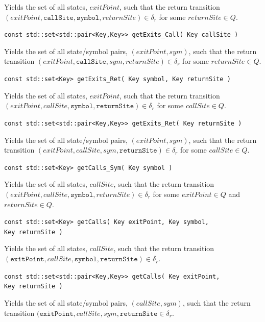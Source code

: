 \documentclass{llncs}
\begin{document}
\begin{description}
    Yields the set of all states, $exitPoint$, such that the return transition $(exitPoint,\texttt{callSite},\texttt{symbol},returnSite) \in \delta_r$ for some $returnSite \in Q$.

  \item\texttt{const std::set<std::pair<Key,Key>> getExits\_Call( Key callSite )}

    Yields the set of all state/symbol pairs, $(exitPoint,sym)$, such that the return transition $(exitPoint,\texttt{callSite},sym,returnSite) \in \delta_r$ for some $returnSite \in Q$.

  \item\texttt{const std::set<Key> getExits\_Ret( Key symbol, Key returnSite )}

    Yields the set of all states, $exitPoint$, such that the return transition $(exitPoint,callSite,\texttt{symbol},\texttt{returnSite}) \in \delta_r$ for some $callSite \in Q$.

  \item\texttt{const std::set<std::pair<Key,Key>> getExits\_Ret( Key returnSite )}

    Yields the set of all state/symbol pairs, $(exitPoint,sym)$, such that the return transition $(exitPoint,callSite,sym,\texttt{returnSite}) \in \delta_r$ for some $callSite \in Q$.

  \item\texttt{const std::set<Key> getCalls\_Sym( Key symbol )}

    Yields the set of all states, $callSite$, such that the return transition $(exitPoint,callSite,\texttt{symbol},returnSite) \in \delta_r$ for some $exitPoint \in Q$ and $returnSite \in Q$.

  \item\texttt{const std::set<Key> getCalls( Key exitPoint, Key symbol,\\ \hspace*{3.25cm} Key returnSite )}

    Yields the set of all states, $callSite$, such that the return transition $(\texttt{exitPoint},callSite,\texttt{symbol},\texttt{returnSite}) \in \delta_r$.

  \item\texttt{const std::set<std::pair<Key,Key>> getCalls( Key exitPoint,\\ \hspace*{3.25cm} Key returnSite )}

    Yields the set of all state/symbol pairs, $(callSite,sym)$, such that the return transition $(\texttt{exitPoint},callSite,sym,\texttt{returnSite} \in \delta_r$.


\end{description}
\end{document}
